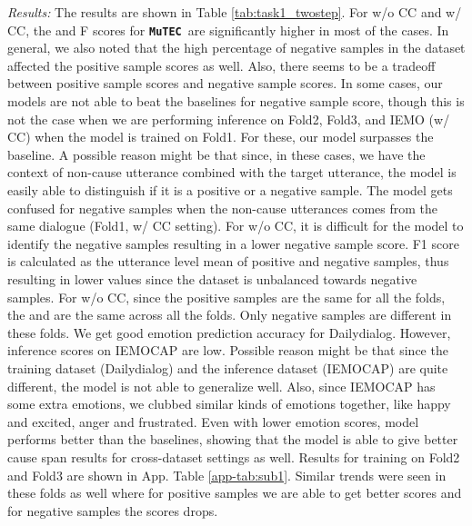\documentclass{article}
\newcommand{\modelname}{\textbf{\texttt{MuTEC}}}
\begin{document}
\noindent\textit{Results:} The results are shown in Table \ref{tab:task1_twostep}. For w/o CC and w/ CC, the  and F scores for \modelname\ are significantly higher in most of the cases. 
In general, we also noted that the high percentage of negative samples in the dataset affected the positive sample scores as well. Also, there seems to be a tradeoff between positive sample scores and negative sample scores. In some cases, our models are not able to beat the baselines for negative sample score, though this is not the case when we are performing inference on Fold2, Fold3, and IEMO (w/ CC) when the model is trained on Fold1. For these, our model surpasses the baseline. A possible reason might be that since, in these cases, we have the context of non-cause utterance combined with the target utterance, the model is easily able to distinguish if it is a positive or a negative sample. The model gets confused for negative samples when the non-cause utterances comes from the same dialogue (Fold1, w/ CC setting). For w/o CC, it is difficult for the model to identify the negative samples resulting in a lower negative sample score. F1 score is calculated as the utterance level mean of positive and negative samples, thus resulting in lower values since the dataset is unbalanced towards negative samples. For w/o CC, since the positive samples are the same for all the folds, the  and  are the same across all the folds. Only negative samples are different in these folds. 
We get good emotion prediction accuracy for Dailydialog. However, inference scores on IEMOCAP are low. Possible reason might be that since the training dataset (Dailydialog) and the inference dataset (IEMOCAP) are quite different, the model is not able to generalize well. Also, since IEMOCAP has some extra emotions, we clubbed similar kinds of emotions together, like happy and excited, anger and frustrated. Even with lower emotion scores, model performs better than the baselines, showing that the model is able to give better cause span results for cross-dataset settings as well. Results for training on Fold2 and Fold3 are shown in App. Table \ref{app-tab:sub1}. Similar trends were seen in these folds as well where for positive samples we are able to get better scores and for negative samples the scores drops. 
\end{document}
